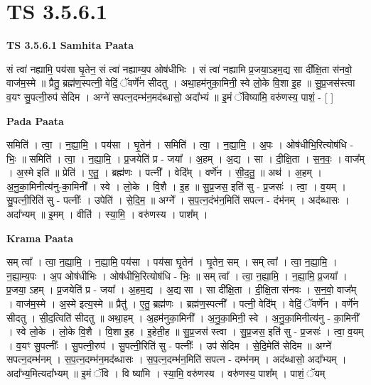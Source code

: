 \documentclass[17pt]{extarticle}
\begin{document}
\section{ TS 3.5.6.1 }

\textbf{TS 3.5.6.1 } \newline
\textbf{Samhita Paata} \newline

सं त्वा॑ नह्यामि॒ पय॑सा घृ॒तेन॒ सं त्वा॑ नह्याम्य॒प ओष॑धीभिः । सं त्वा॑ नह्यामि प्र॒जया॒ऽहम॒द्य सा दी᳚क्षि॒ता स॑नवो॒ वाज॑म॒स्मे ॥ प्रैतु॒ ब्रह्म॑ण॒स्पत्नी॒ वेदिं॒ ॅवर्णे॑न सीदतु । अथा॒हम॑नुका॒मिनी॒ स्वे लो॒के वि॒शा इ॒ह ॥ सु॒प्र॒जस॑स्त्वा व॒यꣳ सु॒पत्नी॒रुप॑ सेदिम । अग्ने॑ सपत्न॒दम्भ॑न॒मद॑ब्धासो॒ अदा᳚भ्यं ॥ इ॒मं ॅविष्या॑मि॒ वरु॑णस्य॒ पाशं॒ - [  ] \newline

\textbf{Pada Paata} \newline

समिति॑ । त्वा॒ । न॒ह्या॒मि॒ । पय॑सा । घृ॒तेन॑ । समिति॑ । त्वा॒ । न॒ह्या॒मि॒ । अ॒पः । ओष॑धीभि॒रित्योष॑धि - भिः॒ ॥ समिति॑ । त्वा॒ । न॒ह्या॒मि॒ । प्र॒जयेति॑ प्र - जया᳚ । अ॒हम् । अ॒द्य । सा । दी॒क्षि॒ता । स॒न॒वः॒ । वाज᳚म् । अ॒स्मे इति॑ ॥ प्रेति॑ । ए॒तु॒ । ब्रह्म॑णः । पत्नी᳚ । वेदि᳚म् । वर्णे॑न । सी॒द॒तु॒ ॥ अथ॑ । अ॒हम् । अ॒नु॒का॒मिनीत्य॑नु-का॒मिनी᳚ । स्वे । लो॒के । वि॒शै । इ॒ह ॥ सु॒प्र॒जस॒ इति॑ सु - प्र॒जसः॑ । त्वा॒ । व॒यम् । सु॒पत्नी॒रिति॑ सु - पत्नीः᳚ । उपेति॑ । से॒दि॒म॒ ॥ अग्ने᳚ । स॒प॒त्न॒दंभ॑न॒मिति॑ सपत्न - दंभ॑नम् । अद॑ब्धासः । अदा᳚भ्यम् ॥ इ॒मम् । वीति॑ । स्या॒मि॒ । वरु॑णस्य । पाश᳚म् ।  \newline


\textbf{Krama Paata} \newline

सम् त्वा᳚ । त्वा॒ न॒ह्या॒मि॒ । न॒ह्या॒मि॒ पय॑सा । पय॑सा घृ॒तेन॑ । घृ॒तेन॒ सम् । सम् त्वा᳚ । त्वा॒ न॒ह्या॒मि॒ । न॒ह्या॒म्य॒पः । अ॒प ओष॑धीभिः । ओष॑धीभि॒रित्योष॑धि - भिः॒ ॥ सम् त्वा᳚ । 
त्वा॒ न॒ह्या॒मि॒ । न॒ह्या॒मि॒ प्र॒जया᳚ । प्र॒जया॒ ऽहम् । प्र॒जयेति॑ प्र - जया᳚ । अ॒हम॒द्य । अ॒द्य सा । सा दी᳚क्षि॒ता । दी॒क्षि॒ता स॑नवः । स॒न॒वो॒ वाज᳚म् । वाज॑म॒स्मे । अ॒स्मे इत्य॒स्मे ॥ प्रैतु॑ । ए॒तु॒ ब्रह्म॑णः । ब्रह्म॑ण॒स्पत्नी᳚ । पत्नी॒ वेदि᳚म् । वेदिं॒ ॅवर्णे॑न । वर्णे॑न सीदतु । सी॒द॒त्विति॑ सीदतु ॥ अथा॒हम् । अ॒हम॑नुका॒मिनी᳚ । अ॒नु॒का॒मिनी॒ स्वे । अ॒नु॒का॒मिनीत्य॑नु - का॒मिनी᳚ । स्वे लो॒के । लो॒के वि॒शै । वि॒शा इ॒ह । इ॒हेती॒ह ॥ सु॒प्र॒जस॑ स्त्वा । सु॒प्र॒जस॒ इति॑ सु - प्र॒जसः॑ । त्वा॒ व॒यम् । व॒यꣳ सु॒पत्नीः᳚ । सु॒पत्नी॒रुप॑ । सु॒पत्नी॒रिति॑ सु - पत्नीः᳚ । उप॑ सेदिम । से॒दि॒मेति॑ सेदिम ॥ अग्ने॑ सपत्न॒दम्भ॑नम् । स॒प॒त्न॒दम्भ॑न॒मद॑ब्धासः । स॒प॒त्न॒दम्भ॑न॒मिति॑ सपत्न - दम्भ॑नम् । अद॑ब्धासो॒ अदा᳚भ्यम् । अदा᳚भ्य॒मित्यदा᳚भ्यम् ॥ इ॒मं ॅवि । वि ष्या॑मि । स्या॒मि॒ वरु॑णस्य । वरु॑णस्य॒ पाश᳚म् । पाशं॒ ॅयम् \newline
\end{document}
